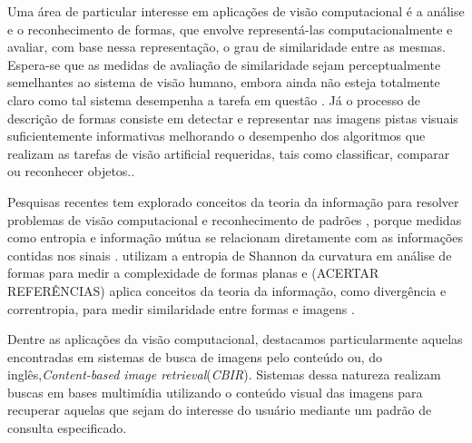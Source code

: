 
Uma área de particular interesse em aplicações de visão computacional é a análise e o reconhecimento de formas, que envolve representá-las computacionalmente e avaliar, com base nessa representação, o grau de similaridade entre as mesmas. Espera-se que as medidas de avaliação de similaridade sejam perceptualmente semelhantes ao sistema de visão humano, embora ainda não esteja totalmente claro como tal sistema desempenha a tarefa em questão \cite{4815272}. Já o processo de descrição de formas consiste em detectar e representar nas imagens pistas visuais suficientemente informativas melhorando o desempenho dos algoritmos que realizam as tarefas de visão artificial requeridas, tais como classificar, comparar ou reconhecer objetos.\cite{Escolano:2009}.

Pesquisas recentes tem explorado conceitos da teoria da informação para resolver problemas de visão computacional e reconhecimento de padrões \cite{Escolano:2009}, porque medidas como entropia e informação mútua se relacionam diretamente com as informações contidas nos sinais \cite{Principe:2011}.  utilizam a entropia de Shannon da curvatura em análise de formas para medir a complexidade de formas planas \color{red} e (ACERTAR REFERÊNCIAS)  aplica conceitos da teoria da informação, como divergência e correntropia, para medir similaridade entre formas e imagens \cite{Principe:2014,Zang:2014}.\color{black}



Dentre as aplicações da visão computacional, destacamos particularmente aquelas encontradas em sistemas de busca de imagens pelo conteúdo ou, do inglês,\foreignlanguage{english}{\emph{Content-based image retrieval}}(\emph{CBIR}). Sistemas dessa natureza realizam buscas em bases multimídia utilizando o conteúdo visual das imagens para recuperar aquelas que sejam do interesse do usuário mediante um padrão de consulta especificado. 

